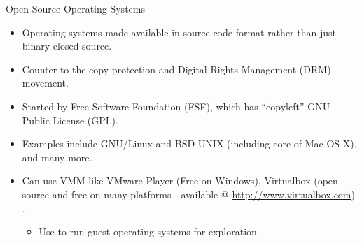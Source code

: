 \documentclass[10pt]{beamer}
\begin{document}

\begin{frame}{Open-Source Operating Systems}
\begin{itemize}
\item Operating systems made available in source-code format rather than just binary closed-source.
\item Counter to the copy protection and Digital Rights Management (DRM) movement.
\item Started by Free Software Foundation (FSF), which has ``copyleft'' GNU Public License (GPL).
\item Examples include GNU/Linux and BSD UNIX (including core of Mac OS X), and many more.
\item Can use VMM like VMware Player (Free on Windows), Virtualbox (open source and free on many platforms - available @ \url{http://www.virtualbox.com}) .
\begin{itemize}
\item Use to run guest operating systems for exploration.
\end{itemize}
\end{itemize}
\end{frame}
\end{document}
